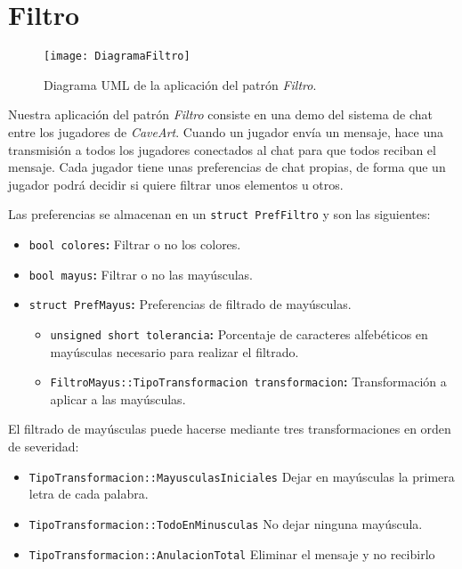 \section{Filtro}

\begin{figure}[ht!]
\begin{center}
	\texttt{[image: DiagramaFiltro]}
\end{center}
\caption{Diagrama UML de la aplicación del patrón \textit{Filtro}.}
\end{figure}

Nuestra aplicación del patrón \textit{Filtro} consiste en una demo del sistema de chat entre los jugadores de \textit{CaveArt}.
Cuando un jugador envía un mensaje, hace una transmisión a todos los jugadores conectados al chat para que todos reciban el mensaje.
Cada jugador tiene unas preferencias de chat propias, de forma que un jugador podrá decidir si quiere filtrar unos elementos u otros.

Las preferencias se almacenan en un \texttt{struct PrefFiltro} y son las siguientes:

\begin{itemize}
	\item\texttt{bool colores}\textbf{:}
		Filtrar o no los colores.
	\item\texttt{bool mayus}\textbf{:}
		Filtrar o no las mayúsculas.
	\item\texttt{struct PrefMayus}\textbf{:}
		Preferencias de filtrado de mayúsculas.
		\begin{itemize}
			\item\texttt{unsigned short tolerancia}\textbf{:}
				Porcentaje de caracteres alfebéticos en mayúsculas necesario para realizar el filtrado.
			\item\texttt{FiltroMayus::TipoTransformacion transformacion}\textbf{:}
				Transformación a aplicar a las mayúsculas.
		\end{itemize}
\end{itemize}

El filtrado de mayúsculas puede hacerse mediante tres transformaciones en orden de severidad:

\begin{itemize}
	\item\texttt{TipoTransformacion::MayusculasIniciales}
		Dejar en mayúsculas la primera letra de cada palabra.
	\item\texttt{TipoTransformacion::TodoEnMinusculas}
		No dejar ninguna mayúscula.
	\item\texttt{TipoTransformacion::AnulacionTotal}
		Eliminar el mensaje y no recibirlo
\end{itemize}

